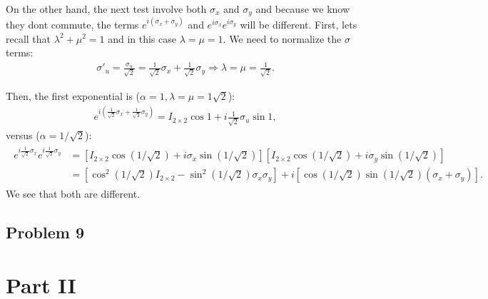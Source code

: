 \documentclass[letterpaper,11pt,twoside]{article}
\begin{document}
On the other hand, the next test involve both $\sigma_x$ and $\sigma_y$ and because we know they 
dont commute, the terms $e^{i(\sigma_x+\sigma_y)}$ and $e^{i\sigma_x}e^{i\sigma_y}$ will be different.
First, lets recall that $\lambda^2+\mu^2=1$ and in this case $\lambda=\mu=1$. We need to normalize the $\sigma$ terms:
\begin{align*}
  \sigma'_u=\frac{\sigma_u}{\sqrt{2}}=\frac{1}{\sqrt{2}}\sigma_x+\frac{1}{\sqrt{2}}\sigma_y\Longrightarrow\lambda=\mu=\frac{1}{\sqrt{2}}.
\end{align*}

Then, the first exponential is ($\alpha=1,\lambda=\mu=1\sqrt{2}$):
\begin{align*}
  e^{i(\frac{1}{\sqrt{2}}\sigma_x+\frac{1}{\sqrt{2}}\sigma_y)}=I_{2\times2}\cos1+i\frac{1}{\sqrt{2}}\sigma_u\sin1,
\end{align*}
versus ($\alpha=1/\sqrt{2}$):
\begin{align*}
  \begin{array}{rl}
    e^{i\frac{1}{\sqrt{2}}\sigma_x}e^{i\frac{1}{\sqrt{2}}\sigma_y}&=[I_{2\times2}\cos(1/\sqrt{2})+i\sigma_x\sin(1/\sqrt{2})][I_{2\times2}\cos(1/\sqrt{2})+i\sigma_y\sin(1/\sqrt{2})]\\
    &=\left[\cos^2(1/\sqrt{2})I_{2\times2}-\sin^2(1/\sqrt{2})\sigma_x\sigma_y\right]+i\left[\cos(1/\sqrt{2})\sin(1/\sqrt{2})(\sigma_x+\sigma_y)\right].
  \end{array}
\end{align*}
We see that both are different.

%
\subsection*{Problem 9}


\section*{Part II}
%
\end{document}
